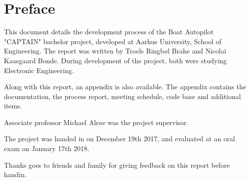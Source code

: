 \chapter{Preface}
This document details the development process of the Boat Autopilot "CAPTAIN" bachelor project, developed at Aarhus University, School of Engineering. The report was written by Troels Ringbøl Brahe and Nicolai Kaasgaard Bonde. During development of the project, both were studying Electronic Engineering.

Along with this report, an appendix is also available. The appendix contains the documentation, the process report, meeting schedule, code base and additional items.

Associate professor Michael Alrøe was the project supervisor.

The project was handed in on December 19th 2017, and evaluated at an oral exam on January 17th 2018.

Thanks goes to friends and family for giving feedback on this report before handin.
